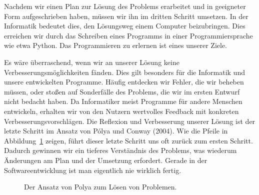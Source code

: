 \documentclass[
  ngerman,
  letterpaper,
  DIV=11]{scrreprt}
\begin{document}
Nachdem wir einen Plan zur Lösung des Problems erarbeitet und in
geeigneter Form aufgeschrieben haben, müssen wir ihn im dritten Schritt
umsetzen. In der Informatik bedeutet dies, den Lösungsweg einem Computer
beizubringen. Dies erreichen wir durch das Schreiben eines Programms in
einer Programmiersprache wie etwa Python. Das Programmieren zu erlernen
ist eines unserer Ziele.

Es wäre überraschend, wenn wir an unserer Lösung keine
Verbesserungsmöglichkeiten fänden. Dies gilt besonders für die
Informatik und unsere entwickelten Programme. Häufig entdecken wir
Fehler, die wir beheben müssen, oder stoßen auf Sonderfälle des
Problems, die wir im ersten Entwurf nicht bedacht haben. Da Informatiker
meist Programme für andere Menschen entwickeln, erhalten wir von den
Nutzern wertvolles Feedback mit konkreten Verbesserungsvorschlägen. Die
Reflexion und Verbesserung unserer Lösung ist der letzte Schritt im
Ansatz von Pólya und Conway (2004). Wie die Pfeile in
Abbildung~\ref{fig-polya} zeigen, führt dieser letzte Schritt uns oft
zurück zum ersten Schritt. Dadurch gewinnen wir ein tieferes Verständnis
des Problems, was wiederum Änderungen am Plan und der Umsetzung
erfordert. Gerade in der Softwareentwicklung ist man eigentlich nie
wirklich fertig.

\begin{figure}


\caption{\label{fig-polya}Der Ansatz von Polya zum Lösen von Problemen.}

\end{figure}%
\end{document}
